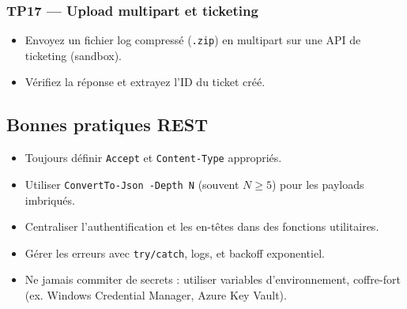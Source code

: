 \documentclass[a4paper,12pt]{article}
\begin{document}
\subsubsection{TP17 — Upload multipart et ticketing}
\begin{itemize}
  \item Envoyez un fichier log compressé (\texttt{.zip}) en multipart sur une API de ticketing (sandbox).
  \item Vérifiez la réponse et extrayez l’ID du ticket créé.
\end{itemize}

\subsection{Bonnes pratiques REST}
\begin{itemize}
  \item Toujours définir \texttt{Accept} et \texttt{Content-Type} appropriés.
  \item Utiliser \texttt{ConvertTo-Json -Depth N} (souvent $N\ge 5$) pour les payloads imbriqués.
  \item Centraliser l’authentification et les en-têtes dans des fonctions utilitaires.
  \item Gérer les erreurs avec \texttt{try/catch}, logs, et backoff exponentiel.
  \item Ne jamais commiter de secrets : utiliser variables d’environnement, coffre-fort (ex. Windows Credential Manager, Azure Key Vault).
\end{itemize}
\end{document}

